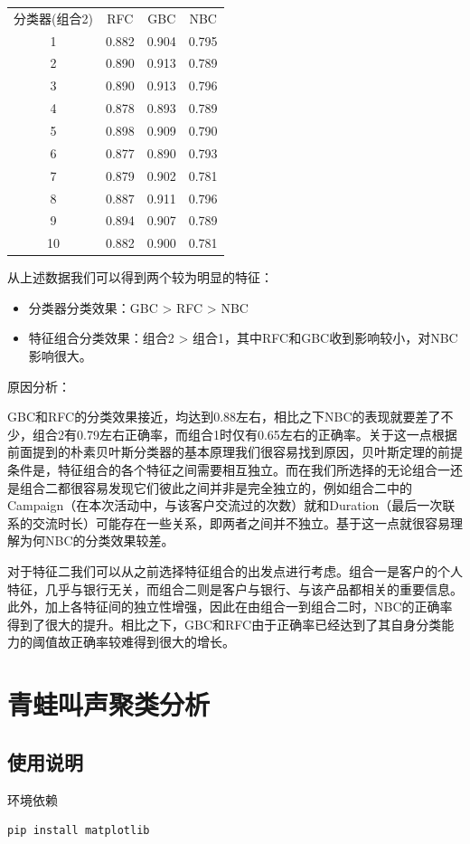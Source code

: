 \documentclass{acm_proc_article-sp}
\begin{document}
\begin{tabular}{cccc}
分类器(组合2)&RFC&GBC&NBC \\
1&0.882&0.904&0.795 \\
2&0.890&0.913&0.789 \\
3&0.890&0.913&0.796 \\
4&0.878&0.893&0.789 \\
5&0.898&0.909&0.790 \\
6&0.877&0.890&0.793 \\
7&0.879&0.902&0.781 \\
8&0.887&0.911&0.796 \\
9&0.894&0.907&0.789 \\
10&0.882&0.900&0.781
\end{tabular}

从上述数据我们可以得到两个较为明显的特征：
\begin{itemize}
    \item 分类器分类效果：GBC > RFC > NBC
    \item 特征组合分类效果：组合2 > 组合1，其中RFC和GBC收到影响较小，对NBC影响很大。
\end{itemize}
原因分析：

GBC和RFC的分类效果接近，均达到0.88左右，相比之下NBC的表现就要差了不少，组合2有0.79左右正确率，而组合1时仅有0.65左右的正确率。关于这一点根据前面提到的朴素贝叶斯分类器的基本原理我们很容易找到原因，贝叶斯定理的前提条件是，特征组合的各个特征之间需要相互独立。而在我们所选择的无论组合一还是组合二都很容易发现它们彼此之间并非是完全独立的，例如组合二中的Campaign（在本次活动中，与该客户交流过的次数）就和Duration（最后一次联系的交流时长）可能存在一些关系，即两者之间并不独立。基于这一点就很容易理解为何NBC的分类效果较差。

对于特征二我们可以从之前选择特征组合的出发点进行考虑。组合一是客户的个人特征，几乎与银行无关，而组合二则是客户与银行、与该产品都相关的重要信息。此外，加上各特征间的独立性增强，因此在由组合一到组合二时，NBC的正确率得到了很大的提升。相比之下，GBC和RFC由于正确率已经达到了其自身分类能力的阈值故正确率较难得到很大的增长。

\section{青蛙叫声聚类分析}
\subsection{使用说明}
环境依赖
\begin{lstlisting}
pip install matplotlib
\end{lstlisting}
\end{document}

